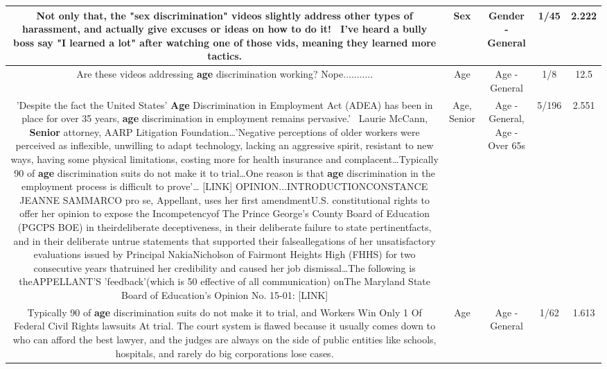 \documentclass[11pt]{article}
\newlength\mylength
\begin{document}
\begin{center}
\begin{longtable}{|C{.65\mylength}|C{.30\mylength}|C{.12\mylength}|C{.12\mylength}|C{.12\mylength}|}
  \small Not only that, the "\textbf{sex} discrimination" videos slightly address other types of harassment, and actually give excuses or ideas on how to do it!  I've heard a bully boss say "I learned a lot" after watching one of those vids, meaning they learned more tactics.\normalsize   & Sex & Gender - General & 1/45 & 2.222 \\  \hline
  \small Are these videos addressing \textbf{age} discrimination working? Nope...........\normalsize   & Age & Age - General & 1/8 & 12.5 \\  \hline
  \small 'Despite the fact the United States' \textbf{Age} Discrimination in Employment Act (ADEA) has been in place for over 35 years, \textbf{age} discrimination in employment remains pervasive.'~ Laurie McCann, \textbf{Senior} attorney, AARP Litigation Foundation…'Negative perceptions of older workers were perceived as inflexible, unwilling to adapt technology, lacking an aggressive spirit, resistant to new ways, having some physical limitations, costing more for health insurance and complacent…Typically 90 of \textbf{age} discrimination suits do not make it to trial…One reason is that \textbf{age} discrimination in the employment process is difficult to prove'… [LINK]  OPINION...INTRODUCTIONCONSTANCE JEANNE SAMMARCO pro se, Appellant, uses her first amendmentU.S. constitutional rights to offer her opinion to expose the Incompetencyof The Prince George's County Board of Education (PGCPS BOE) in theirdeliberate deceptiveness, in their deliberate failure to state pertinentfacts, and in their deliberate untrue statements that supported their falseallegations of her unsatisfactory evaluations issued by Principal NakiaNicholson of Fairmont Heights High (FHHS) for two consecutive years thatruined her credibility and caused her job dismissal…The following is theAPPELLANT'S 'feedback'(which is 50  effective of all communication) onThe Maryland State Board of Education's Opinion No. 15-01: [LINK] \normalsize   & Age, Senior & Age - General, Age - Over 65s & 5/196 & 2.551 \\  \hline
  \small Typically 90 of \textbf{age} discrimination suits do not make it to trial, and Workers Win Only 1 Of Federal Civil Rights lawsuits At trial. The court system is flawed because it usually comes down to who can afford the best lawyer, and the judges are always on the side of public entities like schools, hospitals, and rarely do big corporations lose cases.\normalsize   & Age & Age - General & 1/62 & 1.613 \\  \hline

\end{longtable}
\end{center}
\end{document}
